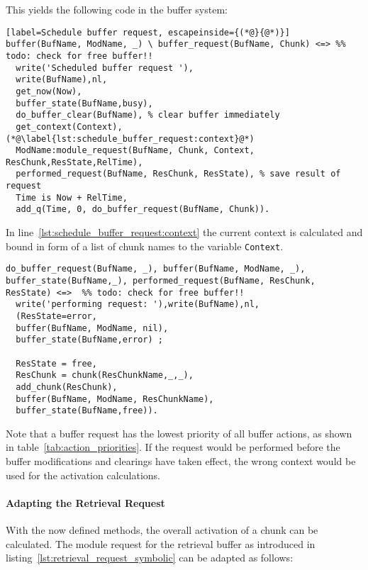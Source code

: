 This yields the following code in the buffer system:

\begin{lstlisting}[label=Schedule buffer request, escapeinside={(*@}{@*)}]
buffer(BufName, ModName, _) \ buffer_request(BufName, Chunk) <=> %% todo: check for free buffer!!
  write('Scheduled buffer request '),
  write(BufName),nl,
  get_now(Now),
  buffer_state(BufName,busy),
  do_buffer_clear(BufName), % clear buffer immediately
  get_context(Context), (*@\label{lst:schedule_buffer_request:context}@*)
  ModName:module_request(BufName, Chunk, Context, ResChunk,ResState,RelTime),
  performed_request(BufName, ResChunk, ResState), % save result of request
  Time is Now + RelTime, 
  add_q(Time, 0, do_buffer_request(BufName, Chunk)).
\end{lstlisting}

In line~\ref{lst:schedule_buffer_request:context} the current context is calculated and bound in form of a list of chunk names to the variable \verb|Context|.
  
\begin{lstlisting}[label=Handle buffer request]
do_buffer_request(BufName, _), buffer(BufName, ModName, _), buffer_state(BufName,_), performed_request(BufName, ResChunk, ResState) <=>  %% todo: check for free buffer!!
  write('performing request: '),write(BufName),nl,
  (ResState=error, 
  buffer(BufName, ModName, nil),
  buffer_state(BufName,error) ;  
  
  ResState = free,
  ResChunk = chunk(ResChunkName,_,_),
  add_chunk(ResChunk), 
  buffer(BufName, ModName, ResChunkName),
  buffer_state(BufName,free)).  
\end{lstlisting}

Note that a buffer request has the lowest priority of all buffer actions, as shown in table~\ref{tab:action_priorities}. If the request would be performed before the buffer modifications and clearings have taken effect, the wrong context would be used for the activation calculations.

\paragraph{Adapting the Retrieval Request}

With the now defined methods, the overall activation of a chunk can be calculated. The module request for the retrieval buffer as introduced in listing~\ref{lst:retrieval_request_symbolic} can be adapted as follows:

